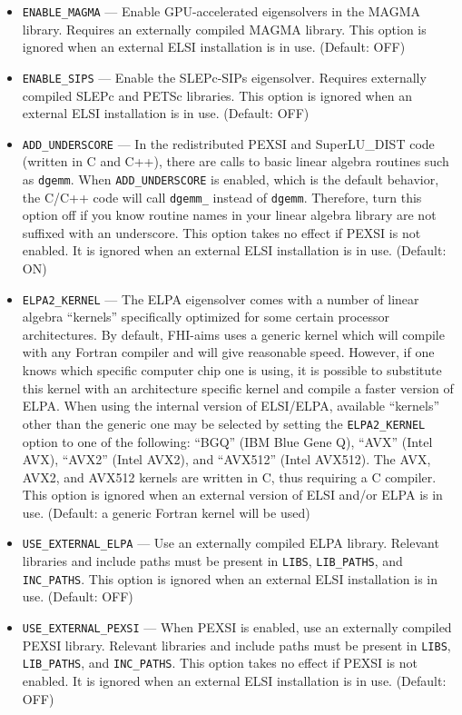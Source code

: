 \begin{itemize}
\item \texttt{ENABLE\_MAGMA} --- Enable GPU-accelerated eigensolvers in the MAGMA library. Requires an externally compiled MAGMA library. This option is ignored when an external ELSI installation is in use. (Default: OFF)
\item \texttt{ENABLE\_SIPS} --- Enable the SLEPc-SIPs eigensolver. Requires externally compiled SLEPc and PETSc libraries. This option is ignored when an external ELSI installation is in use. (Default: OFF)
\item \texttt{ADD\_UNDERSCORE} --- In the redistributed PEXSI and SuperLU\_DIST code (written in C and C++), there are calls to basic linear algebra routines such as \texttt{dgemm}. When \texttt{ADD\_UNDERSCORE} is enabled, which is the default behavior, the C/C++ code will call \texttt{dgemm\_} instead of \texttt{dgemm}. Therefore, turn this option off if you know routine names in your linear algebra library are not suffixed with an underscore. This option takes no effect if PEXSI is not enabled. It is ignored when an external ELSI installation is in use. (Default: ON)
\item \texttt{ELPA2\_KERNEL} --- The ELPA eigensolver comes with a number of linear algebra ``kernels'' specifically optimized for some certain processor architectures. By default, FHI-aims uses a generic kernel which will compile with any Fortran compiler and will give reasonable speed. However, if one knows which specific computer chip one is using, it is possible to substitute this kernel with an architecture specific kernel and compile a faster version of ELPA. When using the internal version of ELSI/ELPA, available ``kernels'' other than the generic one may be selected by setting the \texttt{ELPA2\_KERNEL} option to one of the following: ``BGQ'' (IBM Blue Gene Q), ``AVX'' (Intel AVX), ``AVX2'' (Intel AVX2), and ``AVX512'' (Intel AVX512). The AVX, AVX2, and AVX512 kernels are written in C, thus requiring a C compiler. This option is ignored when an external version of ELSI and/or ELPA is in use. (Default: a generic Fortran kernel will be used)
\item \texttt{USE\_EXTERNAL\_ELPA} --- Use an externally compiled ELPA library. Relevant libraries and include paths must be present in \texttt{LIBS}, \texttt{LIB\_PATHS}, and \texttt{INC\_PATHS}. This option is ignored when an external ELSI installation is in use. (Default: OFF)
\item \texttt{USE\_EXTERNAL\_PEXSI} --- When PEXSI is enabled, use an externally compiled PEXSI library. Relevant libraries and include paths must be present in \texttt{LIBS}, \texttt{LIB\_PATHS}, and \texttt{INC\_PATHS}. This option takes no effect if PEXSI is not enabled. It is ignored when an external ELSI installation is in use. (Default: OFF)

\end{itemize}
